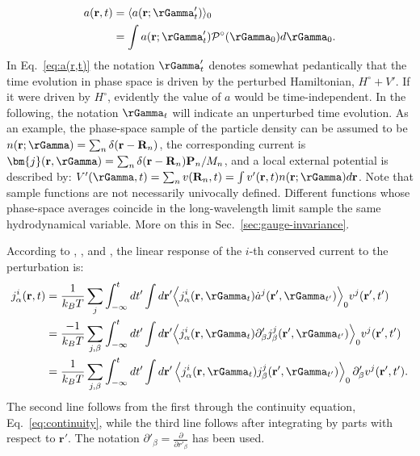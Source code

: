 \begin{equation}
  \begin{aligned}
    a(\mathbf{r},t) &= \langle a(\mathbf{r};\rGamma'_t)\rangle_0 \\
    &= \int a(\mathbf{r};\rGamma'_t) \mathcal{P}^\circ(\rGamma_0) d\rGamma_0.
  \end{aligned} \label{eq:a(r,t)}
\end{equation}
In Eq.~\eqref{eq:a(r,t)} the notation $\rGamma'_t$ denotes somewhat pedantically that the time evolution in phase space is driven by the perturbed Hamiltonian, $H^\circ+V'$. If it were driven by $H^\circ$, evidently the value of $a$ would be time-independent. In the following, the notation $\rGamma_t$ will indicate an unperturbed time evolution. As an example, the phase-space sample of the particle density can be assumed to be $n(\mathbf{r};\rGamma) = \sum_n \delta (\mathbf{r}-\mathbf{R}_n)$, the corresponding current is $\bm{j} (\mathbf{r}, \rGamma) = \sum_n \delta(\mathbf{r}-\mathbf{R}_n) \mathbf{P}_n / M_n $, and a local external potential is described by: $V'(\rGamma,t)=\sum_n v(\mathbf{R}_n,t)=\int v'(\mathbf{r},t) n(\mathbf{r};\rGamma) d \mathbf{r}$. Note that sample functions are not necessarily univocally defined. Different functions whose phase-space averages coincide in the long-wavelength limit sample the same hydrodynamical variable. More on this in Sec.~\ref{sec:gauge-invariance}.

According to \cite{Green1954}, \cite{Kubo1957a}, and \cite{Kubo1957b}, the linear response of the $i$-th conserved current to the perturbation is:
\begin{align}
  j_\alpha^i(\mathbf{r},t) & = \frac{1}{k_B T} \sum_j \int_{-\infty}^t dt' \int d\mathbf{r}' \Bigl \langle j_\alpha^i(\mathbf{r},\rGamma_t)\dot a^j(\mathbf{r}',\rGamma_{t'})\Bigr \rangle_0 v^j(\mathbf{r}',t') \\
  &= \frac{-1}{k_B T} \sum_{j,\beta} \int_{-\infty}^t dt' \int d\mathbf{r}' \Bigl \langle j_\alpha^i(\mathbf{r},\rGamma_t) \partial'_\beta j_\beta^j(\mathbf{r}',\rGamma_{t'})\Bigr \rangle_0 v^j(\mathbf{r}',t') \\
  &= \frac{1}{k_B T} \sum_{j,\beta} \int_{-\infty}^t dt' \int d\mathbf{r}' \left \langle j_\alpha^i(\mathbf{r},\rGamma_{t}) j_\beta^j(\mathbf{r}',\rGamma_{t'})\right \rangle_0 \partial'_\beta v^j(\mathbf{r}',t'). \label{eq:linear-response-c}
\end{align}
The second line follows from the first through the continuity equation, Eq.~\eqref{eq:continuity}, while the third line follows after integrating by parts with respect to $\mathbf{r}'$. The notation $\partial'_\beta=\frac{\partial}{\partial r'_\beta}$ has been used.

